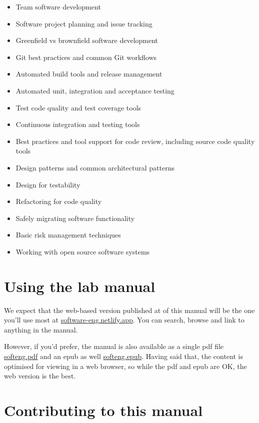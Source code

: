 \documentclass[
]{book}
\providecommand{\tightlist}{%
  \setlength{\itemsep}{0pt}\setlength{\parskip}{0pt}}
\begin{document}
\begin{itemize}
\tightlist
\item
  Team software development
\item
  Software project planning and issue tracking
\item
  Greenfield vs brownfield software development
\item
  Git best practices and common Git workflows
\item
  Automated build tools and release management
\item
  Automated unit, integration and acceptance testing
\item
  Test code quality and test coverage tools
\item
  Continuous integration and testing tools
\item
  Best practices and tool support for code review, including source code quality tools
\item
  Design patterns and common architectural patterns
\item
  Design for testability
\item
  Refactoring for code quality
\item
  Safely migrating software functionality
\item
  Basic risk management techniques
\item
  Working with open source software systems
\end{itemize}

\hypertarget{usingit}{%
\section{Using the lab manual}\label{usingit}}

We expect that the web-based version published at of this manual will be the one you'll use most at \href{https://software-eng.netlify.app/}{software-eng.netlify.app}. You can search, browse and link to anything in the manual.

However, if you'd prefer, the manual is also available as a single pdf file \href{https://software-eng.netlify.app/softeng.pdf}{softeng.pdf} and an epub as well \href{https://software-eng.netlify.app/softeng.epub}{softeng.epub}. Having said that, the content is optimised for viewing in a web browser, so while the pdf and epub are OK, the web version is the best.

\hypertarget{contributing}{%
\section{Contributing to this manual}\label{contributing}}
\end{document}
